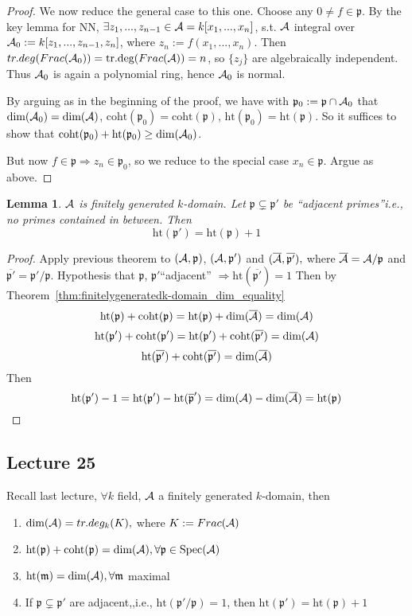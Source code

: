 \documentclass[11pt]{article}
\newtheorem{lemma}[thm]{Lemma}
\newcommand{\scm}{{\mathfrak m}}
\newcommand{\scp}{{\mathfrak p}}
\newcommand{\cala}{{\cal A}}
\newcommand{\Lrta}{\Longrightarrow}
\begin{document}
\begin{proof}
We now reduce the general case to this one.
Choose any $0\neq f\in \scp$. By the key lemma for NN, $\exists z_1,...,z_{n-1}\in\cala=k[x_1,...,x_n]$, s.t. $\cala$ integral over $\cala_0:=k[z_1,...,z_{n-1},z_n]$, where $z_n:=f(x_1,...,x_n)$. Then $tr.deg (Frac(\cala_0))=\text{tr.deg}(Frac(\cala))=n$, so $\{z_j\}$ are algebraically independent. Thus $\cala_0$ is again a polynomial ring, hence $\cala_0$ is normal.

By arguing as in the beginning of the proof, we have with $\scp_0:=\scp\cap\cala_0$ that $\text{dim}(\cala_0)=\text{dim}(\cala)$, $\text{coht}(\scp_0)=\text{coht}(\scp)$, $\text{ht}(\scp_0)=\text{ht}(\scp)$. So it suffices to show that $\text{coht}(\scp_0)+\text{ht}(\scp_0)\geq \text{dim}(\cala_0)$. 

But now $f\in\scp\Lrta z_n\in\scp_0$, so we reduce to the special case $x_n\in\scp$. Argue as above. 
\end{proof}

\begin{lemma}
$\cala$ is finitely generated $k$-domain. Let $\scp\subsetneq \scp'$ be ``adjacent primes''i.e., no primes contained in between. Then 
$$
\text{ht}(\scp')=\text{ht}(\scp)+1
$$
\end{lemma}
\begin{proof}
Apply previous theorem to $(\cala,\scp)$, $(\cala,\scp')$ and $(\overline{\cala},\overline{\scp'}),$ where $\overline{\cala}=\cala/\scp$ and $\overline{\scp'}=\scp'/\scp$. Hypothesis that $\scp$, $\scp'$``adjacent'' $\Lrta \text{ht}(\overline{\scp'})=1$
Then by Theorem~\ref{thm:finitelygeneratedk-domain_dim_equality}
$$
\text{ht}(\scp)+\text{coht}(\scp)=\text{ht}(\scp)+\text{dim}(\overline{\cala})=\text{dim}(\cala)
$$
$$
\text{ht}(\scp')+\text{coht}(\scp')=\text{ht}(\scp')+\text{coht}(\overline{\scp'})=\text{dim}(\cala)
$$
$$
\text{ht}(\overline{\scp'})+\text{coht}(\overline{\scp'})=\text{dim}(\overline{\cala})
$$
Then
$$
\text{ht}(\scp')-1=\text{ht}(\scp')-\text{ht}(\overline{\scp}')=\text{dim}(\cala)-\text{dim}(\overline{\cala})=\text{ht}(\scp)
$$
\end{proof}

\subsection{Lecture 25}
Recall last lecture, $\forall k$ field, $\cala$ a finitely generated $k$-domain, then
\begin{enumerate}[label=(\roman*)]
\item $\text{dim}(\cala)=tr.deg_k(K),$ where $K:=Frac(\cala)$
\item $\text{ht}(\scp)+\text{coht}(\scp)=\text{dim}(\cala),\forall \scp\in \text{Spec}(\cala)$
\item $\text{ht}(\scm)=\text{dim}(\cala),\forall \scm$ maximal
\item If $\scp\subsetneq \scp'$ are adjacent,,i.e., $\text{ht}(\scp'/\scp)=1$, then $\text{ht}(\scp')=\text{ht}(\scp)+1$
\end{enumerate}
\end{document}
